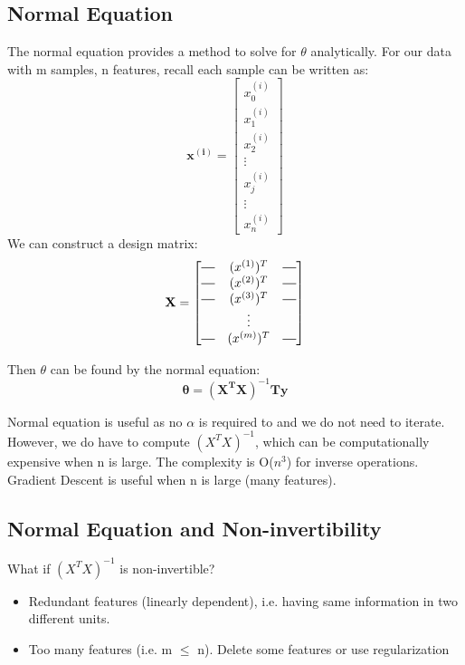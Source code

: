     \subsection{Normal Equation}

        The normal equation provides a method to solve for $\theta$ analytically. For our data with m samples, n features, recall each sample can be written as: 
       \[ 
        \mathbf{x^{(i)}} =  \begin{bmatrix}
            x_0^{(i)}\\
            x_1^{(i)} \\
            x_2^{(i)} \\
            \vdots \\
            x_j^{(i)}\\
           \vdots \\
           x_n^{(i)}
            \end{bmatrix}
        \]
        We can construct a design matrix:
        \begin{equation}
            \mathbf{X} = \begin{bmatrix}
                \horzbar & (x^{(1)})^T & \horzbar \\
                \horzbar & (x^{(2)})^T & \horzbar \\
                \horzbar & (x^{(3)})^T & \horzbar \\
                         & \vdots      &          \\
                \horzbar & (x^{(m)})^T  & \horzbar \\
             \end{bmatrix}
             \label{eq:design-matrix}
        \end{equation}


         Then $\theta$ can be found by the normal equation: 
                 \begin{equation}
                 \mathbf{\theta} = \mathbf{(X^TX)}^{-1}\mathbf{Ty}
                     \label{eq:normal}
                 \end{equation}

        
        Normal equation is useful as no $\alpha$ is required to and we do not need to iterate. However, we do have to compute $(X^TX)^{-1}$, which can be computationally expensive when n is large. The complexity is O($n^3$) for inverse operations. Gradient Descent is useful when n is large (many features). 

     \subsection{Normal Equation and Non-invertibility}

     What if $(X^TX)^{-1}$ is non-invertible? 

     \begin{itemize}
         \item Redundant features (linearly dependent), i.e. having same information in two different units.
         \item Too many features (i.e. m $\leq$ n). Delete some features or use regularization
     \end{itemize}



